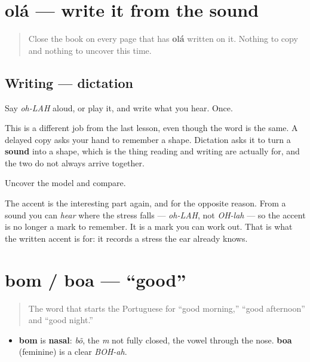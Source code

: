 \section[olá]{olá — write it from the sound}

\label{lesson:PT-W01-ola-dictation}



\begin{quote}
Close the book on every page that has \textbf{olá} written on it. Nothing to copy and nothing to uncover this time.
\end{quote}

\subsection*{Writing — dictation}
Say \emph{oh-LAH} aloud, or play it, and write what you hear. Once.

This is a different job from the last lesson, even though the word is the same. A delayed copy asks your hand to remember a shape. Dictation asks it to turn a \textbf{sound} into a shape, which is the thing reading and writing are actually for, and the two do not always arrive together.

\begin{tcolorbox}[breakable,colback=teal!4,colframe=teal!35!black,title={Before you move on}]
Uncover the model and compare.

The accent is the interesting part again, and for the opposite reason. From a sound you can \emph{hear} where the stress falls — \emph{oh-LAH}, not \emph{OH-lah} — so the accent is no longer a mark to remember. It is a mark you can work out. That is what the written accent is for: it records a stress the ear already knows.
\end{tcolorbox}
\section[bom / boa]{bom / boa — \textquotedblleft{}good\textquotedblright{}}

\label{lesson:PT-C01-bom}



\begin{quote}
The word that starts the Portuguese for \textquotedblleft{}good morning,\textquotedblright{} \textquotedblleft{}good afternoon\textquotedblright{} and \textquotedblleft{}good night.\textquotedblright{}
\end{quote}

\begin{sounds}
\begin{itemize}
\raggedright
  \item \textbf{bom} is \textbf{nasal}: \emph{bõ}, the \emph{m} not fully closed, the vowel through the nose. \textbf{boa} (feminine) is a clear \emph{BOH-ah}.
\end{itemize}
\end{sounds}

